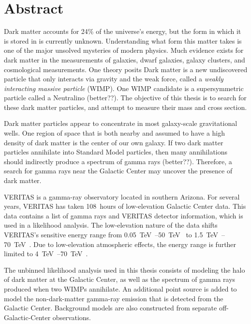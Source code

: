 \cleartooddpage[\thispagestyle{empty}]
\section*{Abstract}

Dark matter accounts for 24\% of the universe's energy, but the form in which it is stored in is currently unknown.
Understanding what form this matter takes is one of the major unsolved mysteries of modern physics.
Much evidence exists for dark matter in the measurements of galaxies, dwarf galaxies, galaxy clusters, and cosmological measurements.
One theory posits Dark matter is a new undiscovered particle that only interacts via gravity and the weak force, called a \textit{weakly interacting massive particle} (WIMP).
One WIMP candidate is a supersymmetric particle called a Neutralino {\color{red}(better??)}.
The objective of this thesis is to search for these dark matter particles, and attempt to measure their mass and cross section.

Dark matter particles appear to concentrate in most galaxy-scale gravitational wells.
One region of space that is both nearby and assumed to have a high density of dark matter is the center of our own galaxy.
If two dark matter particles annihilate into Standard Model particles, then many annihilations should indirectly produce a spectrum of gamma rays {\color{red}(better??)}.
Therefore, a search for gamma rays near the Galactic Center may uncover the presence of dark matter.

VERITAS is a gamma-ray observatory located in southern Arizona.
For several years, VERITAS has taken \SI{108}{hours} of low-elevation Galactic Center data.
This data contains a list of gamma rays and VERITAS detector information, which is used in a likelihood analysis.
The low-elevation nature of the data shifts VERITAS's sensitive energy range from \SIrange{0.05}{50}{\TeV{}} to \SIrange{1.5}{70}{\TeV{}}.
Due to low-elevation atmospheric effects, the energy range is further limited to \SIrange{4}{70}{\TeV{}}.

The unbinned likelihood analysis used in this thesis consists of modeling the halo of dark matter at the Galactic Center, as well as the spectrum of gamma rays produced when two WIMPs annihilate.
An additional point source is added to model the non-dark-matter gamma-ray emission that is detected from the Galactic Center.
Background models are also constructed from separate off-Galactic-Center observations.

